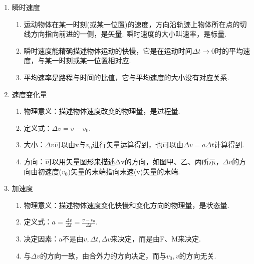 \documentclass[cn,11pt]{elegantbook}
\begin{document}
\begin{enumerate}
\begin{enumerate}
         \end{enumerate}
         \item 瞬时速度
         \begin{enumerate}
            \item 运动物体在某一时刻(或某一位置)的速度，方向沿轨迹上物体所在点的切线方向指向前进的一侧，是矢量. 瞬时速度的大小叫速率，是标量.
            \item 瞬时速度能精确描述物体运动的快慢，它是在运动时间$\Delta t \rightarrow 0$时的平均速度，与某一时刻或某一位置相对应.
            \item 平均速率是路程与时间的比值，它与平均速度的大小没有对应关系.
         \end{enumerate}
         \item 速度变化量
         \begin{enumerate}
            \item 物理意义：描述物体速度改变的物理量，是过程量.
            \item 定义式：$\Delta v=v-v_{0}$.
            \item 大小：$\Delta v$可以由v与$v_{0}$进行矢量运算得到，也可以由$\Delta v=a \Delta t$计算得到.
            \item 方向：可以用矢量图形来描述Δv的方向，如图甲、乙、丙所示，$\Delta v$的方向由初速度($v_{0}$)矢量的末端指向末速(v)矢量的末端.
         \end{enumerate}
         \item 加速度
         \begin{enumerate}
            \item 物理意义：描述物体速度变化快慢和变化方向的物理量，是状态量.
            \item 定义式：$a=\frac{\Delta v}{\Delta t}=\frac{v-v_{0}}{\Delta t}$.
            \item 决定因素：a不是由$v, \Delta t, \Delta v$来决定，而是由F、M来决定.
            \item 与$\Delta v$的方向一致，由合外力的方向决定，而与$v_{0}, v$的方向无关.
         \end{enumerate}
      \end{enumerate}
\end{document}
